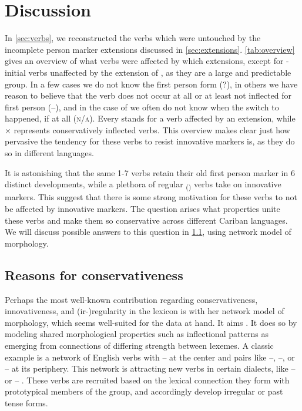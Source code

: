 \section{Discussion}
\label{sec:discussion}
In \cref{sec:verbs}, we reconstructed the verbs which were untouched by the incomplete person marker extensions discussed in \cref{sec:extensions}.
\cref{tab:overview} gives an overview of what verbs were affected by which extensions, except for -initial \akuriyo verbs unaffected by the extension of , as they are a large and predictable group.
In a few cases we do not know the first person form (?), in others we have reason to believe that the verb does not occur at all or at least not inflected for first person (–), and in the case of  we often do not know when the switch to  happened, if at all (\textsc{n/a}).
Every \checkmark stands for a verb affected by an extension, while × represents conservatively inflected verbs.
This overview makes clear just how pervasive the tendency for these verbs to resist innovative markers is, as they do so in different languages.

%

It is astonishing that the same 1-7 verbs retain their old first person marker in 6 distinct developments, while a plethora of regular \textsubscript{()} verbs take on innovative markers.
This suggest that there is some strong motivation for these verbs to not be affected by innovative markers.
The question arises what properties unite these verbs and make them so conservative across different Cariban languages.
We will discuss possible answers to this question in \cref{sec:motivations}, using  network model of morphology.

\subsection{Reasons for conservativeness}
\label{sec:motivations}
Perhaps the most well-known contribution regarding conservativeness, innovativeness, and (ir-){}re\-gu\-la\-ri\-ty in the lexicon is \textcite{bybee1985morphology} with her network model of morphology, which seems well-suited for the data at hand.
It aims  \parencite[428]{bybee1995regular}.
It does so by modeling shared morphological properties such as inflectional patterns as emerging from connections of differing strength between lexemes.
A classic example is a network of  English verbs with -- at the center and pairs like --, --, or -- at its periphery.
This network is attracting new verbs in certain dialects, like -- or -- \parencite[129--130]{bybee1985morphology}.
These verbs are recruited based on the lexical connection they form with prototypical members of the group, and accordingly develop irregular or  past tense forms.

